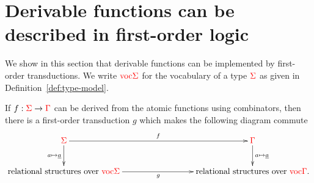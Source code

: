 
\section{Derivable functions can be described in first-order logic}
\label{sec:to-logic}
We show in this section that derivable functions can be implemented by first-order transductions. We write ${\color{red}{\mathrm{voc}}}{\color{red}{\Sigma}}$ for the vocabulary of a type ${\color{red}{\Sigma}}$ as given in Definition~\ref{def:type-model}.

\begin{proposition}\label{prop:to-logic} If $f : {\color{red}{\Sigma}} \to {\color{red}{\Gamma}}$ can be derived from the atomic functions using combinators, then there is a first-order transduction $g$ 
    which makes the following diagram commute
    \begin{align*}
        \xymatrix@C=3cm{
            \rSigma \ar[d]_{a \mapsto \underline a}\ar[r]^f &  \rGamma \ar[d]^{a \mapsto \underline a} \\
            \text{relational structures over $\voctype \rSigma$} \ar[r]_g &  \text{relational structures over $\voctype \rGamma$}.
        } 
    \end{align*}    
\end{proposition}
    
